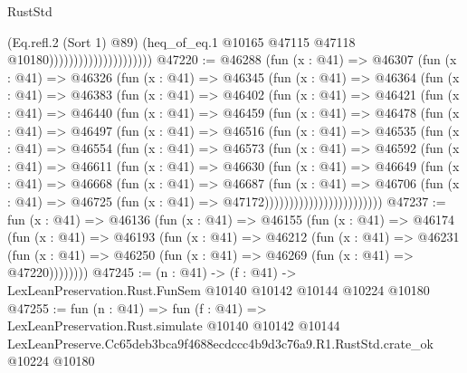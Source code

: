 \begin{lexlean}{RustStd}
\begin{coremodule}
                                            (Eq.refl.{2} (Sort 1) @89)
                                            (heq_of_eq.{1}
                                              @10165
                                              @47115
                                              @47118
                                              @10180)))))))))))))))))))))
@47220 := @46288
    (fun (x : @41) =>
    @46307
      (fun (x : @41) =>
      @46326
        (fun (x : @41) =>
        @46345
          (fun (x : @41) =>
          @46364
            (fun (x : @41) =>
            @46383
              (fun (x : @41) =>
              @46402
                (fun (x : @41) =>
                @46421
                  (fun (x : @41) =>
                  @46440
                    (fun (x : @41) =>
                    @46459
                      (fun (x : @41) =>
                      @46478
                        (fun (x : @41) =>
                        @46497
                          (fun (x : @41) =>
                          @46516
                            (fun (x : @41) =>
                            @46535
                              (fun (x : @41) =>
                              @46554
                                (fun (x : @41) =>
                                @46573
                                  (fun (x : @41) =>
                                  @46592
                                    (fun (x : @41) =>
                                    @46611
                                      (fun (x : @41) =>
                                      @46630
                                        (fun (x : @41) =>
                                        @46649
                                          (fun (x : @41) =>
                                          @46668
                                            (fun (x : @41) =>
                                            @46687
                                              (fun (x : @41) =>
                                              @46706
                                                (fun (x : @41) =>
                                                @46725
                                                  (fun (x : @41) => @47172))))))))))))))))))))))))
@47237 := fun (x : @41) =>
  @46136
    (fun (x : @41) =>
    @46155
      (fun (x : @41) =>
      @46174
        (fun (x : @41) =>
        @46193
          (fun (x : @41) =>
          @46212
            (fun (x : @41) =>
            @46231
              (fun (x : @41) => @46250 (fun (x : @41) => @46269 (fun (x : @41) => @47220))))))))
@47245 := (n : @41) ->
  (f : @41) -> LexLeanPreservation.Rust.FunSem @10140 @10142 @10144 @10224 @10180
@47255 := fun (n : @41) =>
  fun (f : @41) =>
  LexLeanPreservation.Rust.simulate
    @10140
    @10142
    @10144
    LexLeanPreserve.Cc65deb3bca9f4688ecdccc4b9d3c76a9.R1.RustStd.crate_ok
    @10224
    @10180
\end{coremodule}
\end{lexlean}
